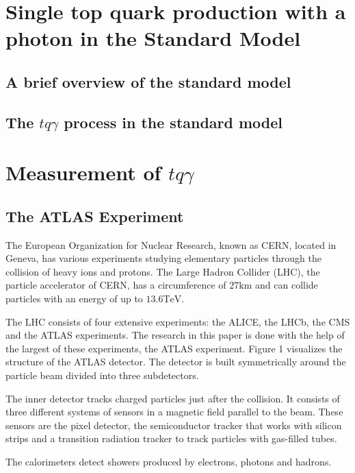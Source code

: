 \chapter{Single top quark production with a photon in the Standard Model}
\section{A brief overview of the standard model}
\section{The \texorpdfstring{$tq\gamma$}{TEXT} process in the standard model}


\chapter{Measurement of \texorpdfstring{$tq\gamma$}{TEXT}}



\section{The ATLAS Experiment}

The European Organization for Nuclear Research, known as CERN, located in Geneva, has various experiments studying elementary particles through the collision of heavy ions and protons. 
The Large Hadron Collider (LHC), the particle accelerator of CERN, has a circumference of $27 \si{\kilo\metre}$ and can collide particles with an energy of up to $13.6 \si{\tera\electronvolt}$. 


The LHC consists of four extensive experiments: the ALICE, the LHCb, the CMS and the ATLAS experiments. The research in this paper is done with the help of the largest of these experiments, the ATLAS experiment. Figure 1 visualizes the structure of the ATLAS detector.  The detector is built symmetrically around the particle beam divided into three subdetectors.

The inner detector tracks charged particles just after the collision. It consists of three different systems of sensors in a magnetic field parallel to the beam. These sensors are the pixel detector, the semiconductor tracker that works with silicon strips and a transition radiation tracker to track particles with gas-filled tubes. 

The calorimeters detect showers produced by electrons, photons and hadrons. 

